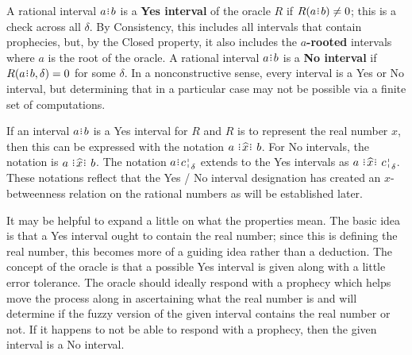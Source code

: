 \documentclass[12pt]{article}
\begin{document}
A rational interval $a\rint b$ is a \textbf{Yes interval} of the oracle $R$ if $R(a\rint b) \neq  0$; this is a check across all $\delta$. By Consistency, this includes all intervals that contain prophecies, but, by the Closed property, it also includes the \textbf{$a$-rooted} intervals where $a$ is the root of the oracle.   A rational interval $a\rint b$ is a \textbf{No interval} if $R(a\rint b, \delta) = 0$ for some $\delta$. In a nonconstructive sense, every interval is a Yes or No interval, but determining that in a particular case may not be possible via a finite set of computations. 

If an interval $a\rint b$ is a Yes interval for $R$ and $R$ is to represent the real number $x$, then this can be expressed with the notation $a \xora b$. For No intervals, the notation is \sout{$a \xora b$}. The notation $a\rint \fuzbright{c}$ extends to the Yes intervals as $a \xora \fuzbright{c}$. These notations reflect that the Yes / No interval designation has created an $x$-betweenness relation on the rational numbers as will be established later.

It may be helpful to expand a little on what the properties mean. The basic idea is that a Yes interval ought to contain the real number; since this is defining the real number, this becomes more of a guiding idea rather than a deduction. The concept of the oracle is that a possible Yes interval is given along with a little error tolerance. The oracle should ideally respond with a prophecy which helps move the process along in ascertaining what the real number is and will determine if the fuzzy version of the given interval contains the real number or not. If it happens to not be able to respond with a prophecy, then the given interval is a No interval. 
\end{document}
